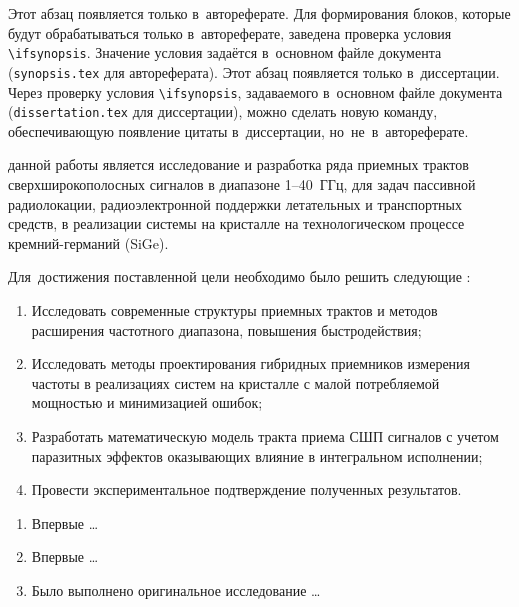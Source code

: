 \ifsynopsis
Этот абзац появляется только в~автореферате.
Для формирования блоков, которые будут обрабатываться только в~автореферате,
заведена проверка условия \verb!\!\verb!ifsynopsis!.
Значение условия задаётся в~основном файле документа (\verb!synopsis.tex! для
автореферата).
\else
Этот абзац появляется только в~диссертации.
Через проверку условия \verb!\!\verb!ifsynopsis!, задаваемого в~основном файле
документа (\verb!dissertation.tex! для диссертации), можно сделать новую
команду, обеспечивающую появление цитаты в~диссертации, но~не~в~автореферате.
\fi


{\aim} данной работы является исследование и разработка ряда приемных трактов сверхширокополосных сигналов в диапазоне \numrange[]{1}{40}~ГГц, для задач пассивной радиолокации, радиоэлектронной поддержки летательных и транспортных средств, в реализации системы на кристалле на технологическом процессе кремний-германий (SiGe).

Для~достижения поставленной цели необходимо было решить следующие {\tasks}:
\begin{enumerate}[beginpenalty=10000] %
  \item Исследовать современные структуры приемных трактов и методов расширения частотного диапазона, повышения быстродействия;
  \item Исследовать методы проектирования гибридных приемников измерения частоты в реализациях систем на кристалле с малой потребляемой мощностью и минимизацией ошибок;
  \item Разработать математическую модель тракта приема СШП сигналов с учетом паразитных эффектов оказывающих влияние в интегральном исполнении;
  \item Провести экспериментальное подтверждение полученных результатов.
\end{enumerate}

{\novelty}
\begin{enumerate}[beginpenalty=10000] %
  \item Впервые \ldots
  \item Впервые \ldots
  \item Было выполнено оригинальное исследование \ldots
\end{enumerate}

